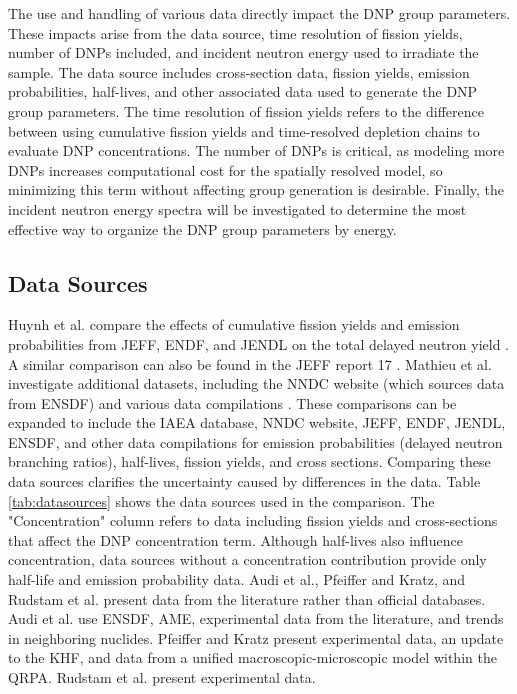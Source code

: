 The use and handling of various data directly impact the \gls{DNP} group parameters.
These impacts arise from the data source, time resolution of fission yields, number of \glspl{DNP} included, and incident neutron energy used to irradiate the sample.
The data source includes cross-section data, fission yields, emission probabilities, half-lives, and other associated data used to generate the \gls{DNP} group parameters.
The time resolution of fission yields refers to the difference between using cumulative fission yields and time-resolved depletion chains to evaluate \gls{DNP} concentrations.
The number of \glspl{DNP} is critical, as modeling more \glspl{DNP} increases computational cost for the spatially resolved model, so minimizing this term without affecting group generation is desirable.
Finally, the incident neutron energy spectra will be investigated to determine the most effective way to organize the \gls{DNP} group parameters by energy.

\subsection{Data Sources}
Huynh et al. compare the effects of cumulative fission yields and emission probabilities from \gls{JEFF}, \gls{ENDF}, and \gls{JENDL} on the total delayed neutron yield \cite{huynh2014calculation}.
A similar comparison can also be found in the \gls{JEFF} report 17 \cite{bank2000jef}.
Mathieu et al. investigate additional datasets, including the \gls{NNDC} website (which sources data from \gls{ENSDF}) and various data compilations \cite{mathieu2012new, pfeiffer2002status, audi2003nubase, rudstam1993delayed}.
These comparisons can be expanded to include the \gls{IAEA} database, \gls{NNDC} website, \gls{JEFF}, \gls{ENDF}, \gls{JENDL}, \gls{ENSDF}, and other data compilations for emission probabilities (delayed neutron branching ratios), half-lives, fission yields, and cross sections.
Comparing these data sources clarifies the uncertainty caused by differences in the data.
Table \ref{tab:datasources} shows the data sources used in the comparison.
The "Concentration" column refers to data including fission yields and cross-sections that affect the \gls{DNP} concentration term.
Although half-lives also influence concentration, data sources without a concentration contribution provide only half-life and emission probability data.
Audi et al., Pfeiffer and Kratz, and Rudstam et al. present data from the literature rather than official databases.
Audi et al. use \gls{ENSDF}, \gls{AME}, experimental data from the literature, and trends in neighboring nuclides.
Pfeiffer and Kratz present experimental data, an update to the \gls{KHF}, and data from a unified macroscopic-microscopic model within the \gls{QRPA}.
Rudstam et al. present experimental data.

